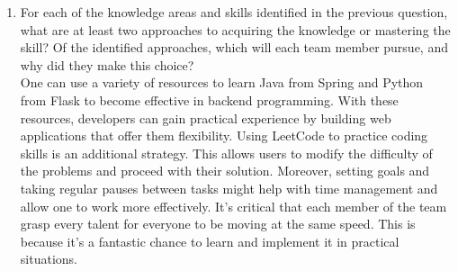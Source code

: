 \documentclass[12pt, titlepage]{article}
\begin{document}
\begin{enumerate}
  \item For each of the knowledge areas and skills identified in the previous question, what are at least two approaches to acquiring the knowledge or mastering the skill?  Of the identified approaches, which will each team member pursue, and why did they make this choice?\\
  One can use a variety of resources to learn Java from Spring and Python from Flask to become effective in backend programming. With these resources, developers can gain practical experience by building web applications that offer them flexibility. Using LeetCode to practice coding skills is an additional strategy. This allows users to modify the difficulty of the problems and proceed with their solution. Moreover, setting goals and taking regular pauses between tasks might help with time management and allow one to work more effectively. It's critical that each member of the team grasp every talent for everyone to be moving at the same speed. This is because it's a fantastic chance to learn and implement it in practical situations.
\end{enumerate}
\end{document}
